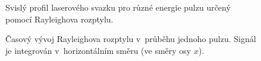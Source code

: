 \begin{figure}
	
	\caption{Svislý profil laserového svazku pro různé energie pulzu
		určený pomocí Rayleighova rozptylu.}
	\label{fig:lif-rayleigh-profile}
\end{figure}

\begin{figure}
	\centerline{}
	\caption{Časový vývoj Rayleighova rozptylu v~průběhu jednoho pulzu.
		Signál je integrován v~horizontálním směru (ve směry osy $x$).}
	\label{fig:lif-rayleigh-time}
\end{figure}
